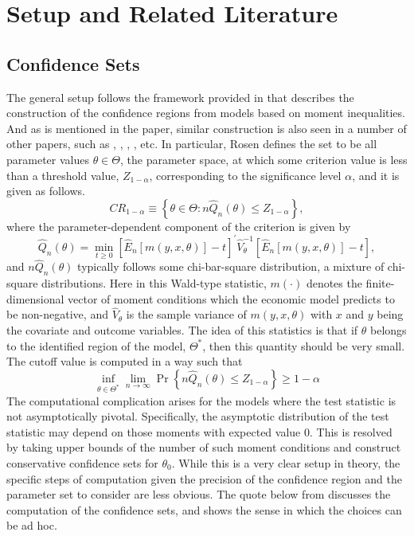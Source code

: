 \documentclass[12pt]{article}
\theoremstyle{definition}
\begin{document}
\section{Setup and Related Literature}\label{lit_review}
\subsection{Confidence Sets}
The general setup follows the framework provided in \cite{Rosen2008} that describes the construction of the confidence regions from models based on moment inequalities. And as is mentioned in the paper, similar construction is also seen in a number of other papers, such as \cite{Wolak1991}, \cite{Ciliberto_Tamer}, \cite{ALG-2016}, \cite{Li_Henry}, etc. In particular, Rosen defines the set to be all parameter values $\theta\in\Theta$, the parameter space, at which some criterion value is less than a threshold value, $Z_{1-\alpha}$, corresponding to the significance level $\alpha$, and it is given as follows. 
\begin{equation}\label{eq1}
C R_{1-\alpha} \equiv\left\{\theta \in \Theta: n \hat{Q}_{n}(\theta) \leq Z_{1-\alpha}\right\},
\end{equation}
where the parameter-dependent component of the criterion is given by
\begin{equation}
\hat{Q}_{n}(\theta)=\min _{t \geq 0}\left[\hat{E}_{n}[m(y, x, \theta)]-t\right]^{\prime} \hat{V}_{\theta}^{-1}\left[\hat{E}_{n}[m(y, x, \theta)]-t\right],
\end{equation}
and $n\hat{Q}_n(\theta)$ typically follows some chi-bar-square distribution, a mixture of chi-square distributions. Here in this Wald-type statistic, $m(\cdot)$ denotes the finite-dimensional vector of moment conditions which the economic model predicts to be non-negative, and $\hat{V}_\theta$ is the sample variance of $m(y,x,\theta)$ with $x$ and $y$ being the covariate and outcome variables. The idea of this statistics is that if $\theta$ belongs to the identified region of the model, $\Theta^*$, then this quantity should be very small. The cutoff value is computed in a way such that 
\begin{equation}
\inf _{\theta \in \Theta^{*}} \lim _{n \rightarrow \infty} \operatorname{Pr}\left\{n \hat{Q}_{n}(\theta) \leq Z_{1-\alpha}\right\} \geq 1-\alpha
\end{equation}
The computational complication arises for the models where the test statistic is not asymptotically pivotal. Specifically, the asymptotic distribution of the test statistic may depend on those moments with expected value $0$. This is resolved by taking upper bounds of the number of such moment conditions and construct conservative confidence sets for $\theta_0$. While this is a very clear setup in theory, the specific steps of computation given the precision of the confidence region and the parameter set to consider are less obvious. The quote below from \cite{Rosen2008} discusses the computation of the confidence sets, and shows the sense in which the choices can be ad hoc.
\end{document}
